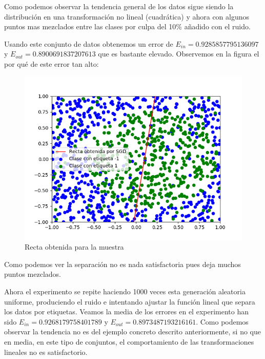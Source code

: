\documentclass[12pt,a4paper]{article}
\begin{document}
Como podemos observar la tendencia general de los datos sigue siendo la distribución en una  transformación no lineal (cuadrática) y ahora con algunos puntos mas mezclados entre las clases por culpa del 10\% añadido con el ruido.

Usando este conjunto de datos obtenemos un error de $E_{in} = 0.9285857795136097$ y $E_{out} = 0.8900691837207613$ que es bastante elevado. Observemos en la figura el por qué de este error tan alto:

\begin{figure}[H]
	\centering
	\includegraphics[scale=0.8]{./Imagenes/ej2-2-4.png}
	\caption{Recta obtenida para la muestra}
	\label{ej2-2-4}
\end{figure}

Como podemos ver la separación no es nada satisfactoria pues deja muchos puntos mezclados.

Ahora el experimento se repite haciendo 1000 veces esta generación aleatoria uniforme, produciendo el ruido e intentando ajustar la función lineal que separa los datos por etiquetas. Veamos la media de los errores en el experimento han sido $E_{in} = 0.9268179758401789$ y $E_{out} = 0.8973487193216161$. Como podemos observar la tendencia no es del ejemplo concreto descrito anteriormente, si no que en media, en este tipo de conjuntos, el comportamiento de las transformaciones lineales no es satisfactorio.
\end{document}
